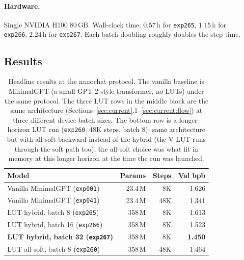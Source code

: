 \documentclass[11pt]{article}
\begin{document}
\paragraph{Hardware.}
Single NVIDIA H100 80\,GB.
Wall-clock time: $0.57$\,h for \texttt{exp265}, $1.15$\,h for \texttt{exp266}, $2.24$\,h for \texttt{exp267}.
Each batch doubling roughly doubles the step time.

\subsection{Results}
\label{sec:current:results}

\begin{table}[!t]
\caption{Headline results at the nanochat protocol. The vanilla baseline is MinimalGPT (a small GPT-2-style transformer, no LUTs) under the same protocol. The three LUT rows in the middle block are the same architecture (Sections~\ref{sec:current}.1--\ref{sec:current:flow}) at three different device batch sizes. The bottom row is a longer-horizon LUT run (\texttt{exp260}, 48K steps, batch 8): same architecture but with all-soft backward instead of the hybrid (the V LUT runs through the soft path too); the all-soft choice was what fit in memory at this longer horizon at the time the run was launched.}
\label{tab:current}
\centering
\begin{tabular}{lrrr}
\toprule
Model & Params & Steps & Val bpb \\
\midrule
Vanilla MinimalGPT (\texttt{exp001})                       & 23.4\,M   & 8K  & 1.626 \\
Vanilla MinimalGPT (\texttt{exp041})                       & 23.4\,M   & 48K & 1.341 \\
\midrule
LUT hybrid, batch 8  (\texttt{exp265})                     & 358\,M    & 8K  & 1.613 \\
LUT hybrid, batch 16 (\texttt{exp266})                     & 358\,M    & 8K  & 1.523 \\
\textbf{LUT hybrid, batch 32 (\texttt{exp267})}            & 358\,M    & 8K  & \textbf{1.450} \\
\midrule
LUT all-soft, batch 8 (\texttt{exp260})                    & 358\,M    & 48K & 1.464 \\
\bottomrule
\end{tabular}
\end{table}
\end{document}
